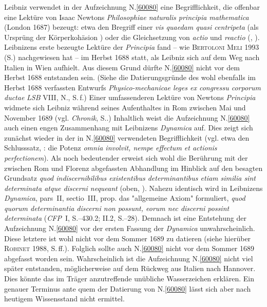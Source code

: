 \pend%
\pstart%
Leibniz verwendet in der Aufzeichnung N.\;\ref{60080} eine Begrifflichkeit, die offenbar eine Lektüre von Isaac Newtons \textit{Philosophiae naturalis principia mathematica} (London 1687)\cite{00535} bezeugt:
etwa den Bregriff einer \textit{vis quaedam quasi centripeta} (als Ursprüng der Körperkohäsion ) oder die Gleichsetzung von \textit{actio} und \textit{reactio} (, ).
Leibnizens erste bezeugte Lektüre der \textit{Principia}\cite{00535} fand – wie \textsc{Bertoloni Meli} 1993 (S.)\cite{01357} nachgewiesen hat – im Herbst 1688 statt, als Leibniz sich auf dem Weg nach Italien in Wien aufhielt.
Aus diesem Grund dürfte N.\;\ref{60080} nicht vor dem Herbst 1688 entstanden sein.
(Siehe die Datierungsgründe des wohl ebenfalls im Herbst 1688 verfassten Entwurfs \textit{Physico-mechanicae leges ex congressu corporum ductae} \textit{LSB} VIII, N.,\cite{02604} S.\,f.)
Einer umfassenderen Lektüre von Newtons \textit{Principia}\cite{00535} widmete sich Leibniz während seines Aufenthaltes in Rom zwischen Mai und November 1689 (vgl. \textit{Chronik}, S..)\cite{01236}
\pend%
\pstart%
Inhaltlich weist die Aufzeichnung N.\;\ref{60080} auch einen engen Zusammenhang mit Leibnizens \textit{Dynamica}\cite{01354} auf.
Dies zeigt sich zunächst wieder in der in N.\;\ref{60080} verwendeten Begrifflichkeit (vgl. etwa den Schlusssatz, : die Potenz \textit{omnia involvit, nempe effectum et actionis perfectionem}).
Als noch bedeutender erweist sich wohl die Berührung mit der zwischen Rom und Florenz abgefassten Abhandlung im Hinblick auf den besagten Grundsatz \textit{quod indiscernibilibus existentibus determinantibus etiam similia sint determinata atque discerni nequeant} (oben, ).
Nahezu identisch wird in Leibnizens \textit{Dynamica}, pars~II, sectio~III, prop. das "allgemeine Axiom" formuliert, \textit{quod quorum determinantia discerni non possunt, eorum nec discerni possint determinata} (\textit{CFP}~I, S.--430.2; II.2, S.--28).\cite{01354}
Demnach ist eine Entstehung der Aufzeichnung N.\;\ref{60080} vor der ersten Fassung der \textit{Dynamica}\cite{01354} unwahrscheinlich.
Diese letztere ist wohl nicht vor dem Sommer 1689 zu datieren (siehe hierüber \textsc{Robinet} 1988, S.\,ff.).\cite{01240}
Folglich sollte auch N.\;\ref{60080} nicht vor dem Sommer 1689 abgefasst worden sein.
\pend%
\pstart%
Wahrscheinlich ist die Aufzeichnung N.\;\ref{60080} nicht viel später entstanden, möglicherweise auf dem Rückweg aus Italien nach Hannover.
Dies könnte das im Träger anzutreffende unübliche Wasserzeichen erklären.
Ein genauer Terminus ante quem der Datierung von N.\;\ref{60080} lässt sich aber nach heutigem Wissensstand nicht ermittel.
\pend%
%
\frenchspacing%
\normalsize%
